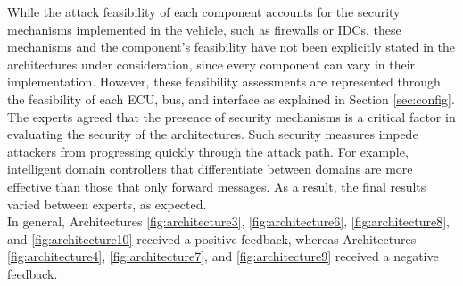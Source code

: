 While the attack feasibility of each component accounts for the security mechanisms implemented in the vehicle, such as firewalls or IDCs, 
these mechanisms and the component's feasibility have not been explicitly stated in the architectures under consideration, since every component can vary in their implementation.
However, these feasibility assessments are represented through the feasibility of each ECU, bus, and interface as explained in Section \ref{sec:config}.
The experts agreed that the presence of security mechanisms is a critical factor in evaluating the security of the architectures.
Such security measures impede attackers from progressing quickly through the attack path. 
For example, intelligent domain controllers that differentiate between domains are more effective than those that only forward messages.
As a result, the final results varied between experts, as expected.\\

In general, Architectures \ref{fig:architecture3}, \ref{fig:architecture6}, \ref{fig:architecture8}, and \ref{fig:architecture10} received a positive feedback,
whereas Architectures \ref{fig:architecture4}, \ref{fig:architecture7}, and \ref{fig:architecture9} received a negative feedback.
